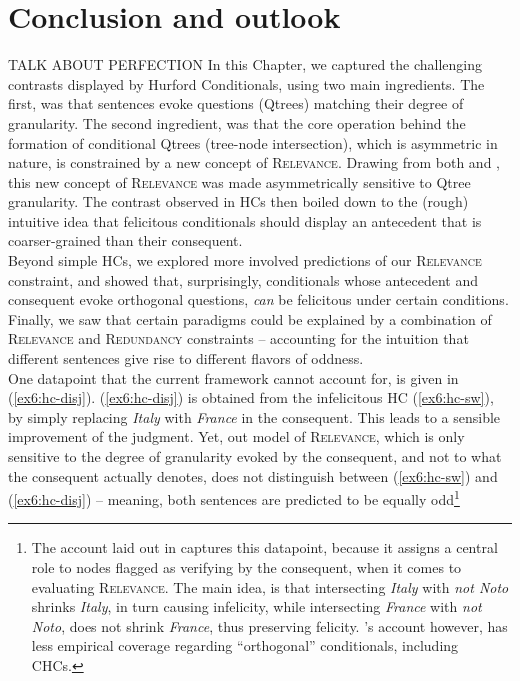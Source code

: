 \section{Conclusion and outlook}\label{sec6:ccl}

TALK ABOUT PERFECTION
In this Chapter, we captured the challenging contrasts displayed by Hurford Conditionals, using two main ingredients. The first, was that sentences evoke questions (Qtrees) matching their degree of granularity. The second ingredient, was that the core operation behind the formation of conditional Qtrees (tree-node intersection), which is asymmetric in nature, is constrained by a new concept of \textsc{Relevance}. Drawing from both \citet{Lewis1988} and \citet{Roberts2012}, this new concept of \textsc{Relevance} was made asymmetrically sensitive to Qtree granularity. The contrast observed in HCs then boiled down to the (rough) intuitive idea that felicitous conditionals should display an antecedent that is coarser-grained than their consequent.\\

 Beyond simple HCs, we explored more involved predictions of our \textsc{Relevance} constraint, and showed that, surprisingly, conditionals whose antecedent and consequent evoke orthogonal questions, \textit{can} be felicitous under certain conditions. Finally, we saw that certain paradigms could be explained by a combination of \textsc{Relevance} and \textsc{Redundancy} constraints -- accounting for the intuition that different sentences give rise to different flavors of oddness.\\

One datapoint that the current framework cannot account for, is given in (\ref{ex6:hc-disj}). (\ref{ex6:hc-disj}) is obtained from the infelicitous HC (\ref{ex6:hc-sw}), by simply replacing \textit{Italy} with \textit{France} in the consequent. This leads to a sensible improvement of the judgment. Yet, out model of \textsc{Relevance}, which is only sensitive to the degree of granularity evoked by the consequent, and not to what the consequent actually denotes, does not distinguish between (\ref{ex6:hc-sw}) and (\ref{ex6:hc-disj}) -- meaning, both sentences are predicted to be equally odd\footnote{The account laid out in \citet{HenotMortier2024a} captures this datapoint, because it assigns a central role to nodes flagged as verifying by the consequent, when it comes to evaluating \textsc{Relevance}. The main idea, is that intersecting \textit{Italy} with \textit{not Noto} shrinks \textit{Italy}, in turn causing infelicity, while intersecting \textit{France} with \textit{not Noto}, does not shrink \textit{France}, thus preserving felicity. \citeauthor{HenotMortier2024a}'s account however, has less empirical coverage regarding ``orthogonal'' conditionals, including CHCs.}

